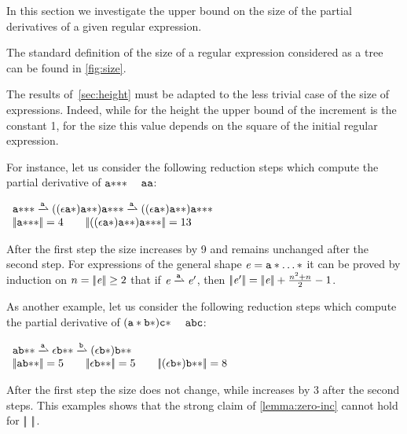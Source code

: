In this section we investigate the upper bound on the size of the partial derivatives of a given regular expression.

The standard definition of the size of a regular expression considered as a tree can be found in \cref{fig:size}.

The results of~\cref{sec:height} must be adapted to the less trivial case of the size of expressions. Indeed, while for the height the upper bound of the increment is the constant 1, for the size this value depends on the square of the initial regular expression.

For instance, let us consider the following reduction steps which compute the partial derivative of ${{{\mathtt {a}}*}*}*$
\wrt~ $\mathtt {a}\mathtt {a}$:
\begin{flushleft}
 $
  \begin{array}{l}
   \starop{\starop{\starop{\sym}}}\parDer{\sym}((\eps\catop\starop{\sym})\catop\starop{\starop{\sym}})\catop\starop{\starop{\starop{\sym}}}\parDer{\sym}((\eps\catop\starop{\sym})\catop\starop{\starop{\sym}})\catop\starop{\starop{\starop{\sym}}} \\
   \tsize{\starop{\starop{\starop{\sym}}}}=4\qquad  \tsize{((\eps\catop\starop{\sym})\catop\starop{\starop{\sym}})\catop\starop{\starop{\starop{\sym}}}}=13
  \end{array}
 $
\end{flushleft}
After the first step the size increases by 9 and remains unchanged after the second step.
For expressions of the general shape $\mathit {e}={\mathtt {a}}*\ldots*$ it can be proved by induction on $n={{\mid\!\mid}}{\mathit {e}}{{\mid\!\mid}}\geq 2$ that if $\re\parDer{\sym}\re'$, then
${{\mid\!\mid}}{\mathit {e}'}{{\mid\!\mid}}={{\mid\!\mid}}{\mathit {e}}{{\mid\!\mid}}+\frac{n^2+n}{2}-1$.

As another example, let us consider the following reduction steps which compute the partial derivative of $({\mathtt {a}}*{\mathtt {b}}*){\mathtt {c}}*$
\wrt~ $\mathtt {a}\mathtt {b}\mathtt {c}$:
\begin{flushleft}
 $
  \begin{array}{l}
   \sym\catop\starop{\starop{\asym}}\parDer{\sym}\eps\catop\starop{\starop{\asym}}\parDer{\asym}(\eps\catop\starop{\asym})\catop\starop{\starop{\asym}} \\
   \tsize{\sym\catop\starop{\starop{\asym}}}=5\qquad  \tsize{\eps\catop\starop{\starop{\asym}}}=5 \qquad \tsize{(\eps\catop\starop{\asym})\catop\starop{\starop{\asym}}}=8
  \end{array}
 $
\end{flushleft}
After the first step the size does not change, while increases by 3 after the second steps. This examples shows that the strong claim of \cref{lemma:zero-inc} cannot hold for ${{\mid\!\mid}}{\ }{{\mid\!\mid}}$.

